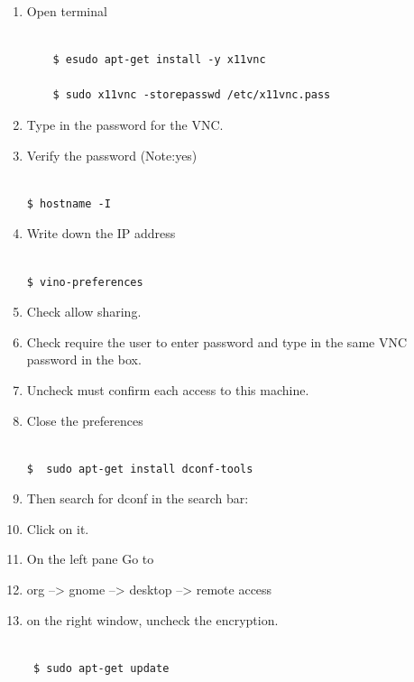 \documentclass[12pt]{article}
\begin{document}
\begin{enumerate}
     \item Open terminal
\begin{lstlisting}

    $ esudo apt-get install -y x11vnc

    $ sudo x11vnc -storepasswd /etc/x11vnc.pass

\end{lstlisting}
     \item Type in the password for the VNC.
     \item Verify the password (Note:yes)

\begin{lstlisting}

$ hostname -I

\end{lstlisting}

     \item Write down the IP address
\begin{lstlisting}

$ vino-preferences

\end{lstlisting}
     \item Check allow sharing.
     \item Check require the user to enter password and type in the same VNC password in the box.
     \item Uncheck must confirm each access to this machine.
     \item Close the preferences
\begin{lstlisting}

$  sudo apt-get install dconf-tools

\end{lstlisting}
     \item Then search for dconf in the search bar:
     \item Click on it.
     \item On the left pane Go to
     \item org --> gnome --> desktop --> remote access
     \item on the right window, uncheck the encryption.

\begin{lstlisting}

 $ sudo apt-get update


\end{lstlisting}
\end{enumerate}
\end{document}

